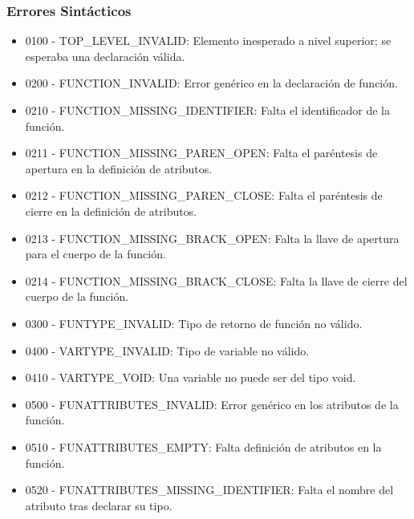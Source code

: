 \subsubsection*{Errores Sintácticos}
\begin{itemize}
    \item 0100 - TOP\_LEVEL\_INVALID: Elemento inesperado a nivel superior; se esperaba una declaración válida.

    \item 0200 - FUNCTION\_INVALID: Error genérico en la declaración de función.
    \item 0210 - FUNCTION\_MISSING\_IDENTIFIER: Falta el identificador de la función.
    \item 0211 - FUNCTION\_MISSING\_PAREN\_OPEN: Falta el paréntesis de apertura en la definición de atributos.
    \item 0212 - FUNCTION\_MISSING\_PAREN\_CLOSE: Falta el paréntesis de cierre en la definición de atributos.
    \item 0213 - FUNCTION\_MISSING\_BRACK\_OPEN: Falta la llave de apertura para el cuerpo de la función.
    \item 0214 - FUNCTION\_MISSING\_BRACK\_CLOSE: Falta la llave de cierre del cuerpo de la función.

    \item 0300 - FUNTYPE\_INVALID: Tipo de retorno de función no válido.

    \item 0400 - VARTYPE\_INVALID: Tipo de variable no válido.
    \item 0410 - VARTYPE\_VOID: Una variable no puede ser del tipo void.

    \item 0500 - FUNATTRIBUTES\_INVALID: Error genérico en los atributos de la función.
    \item 0510 - FUNATTRIBUTES\_EMPTY: Falta definición de atributos en la función.
    \item 0520 - FUNATTRIBUTES\_MISSING\_IDENTIFIER: Falta el nombre del atributo tras declarar su tipo.


\end{itemize}

